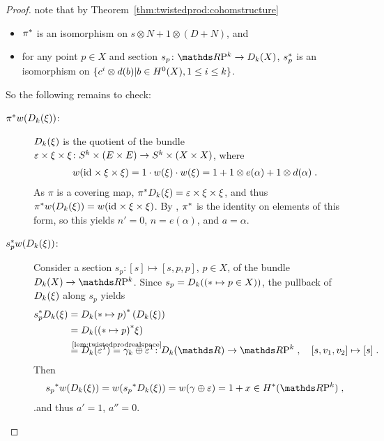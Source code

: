 \begin{Cor}
\begin{proof}
    note that by Theorem~\ref{thm:twistedprod:cohomstructure}
    \begin{itemize}
    \item ${\pi}^*$ is an isomorphism on $s\otimes N+1\otimes(D+N)$, and
    \item for any point $p\in X$ and section $s_p\colon\RP
      k\to\Twistedprod{k}{X}$, ${s}^*_p$ is an isomorphism on
      $\{c^i\otimes d(b)|b\in H^0(X), 1\leq i\leq k\}$.
    \end{itemize}
    So the following remains to check:
    \begin{description}
    \item[${\pi}^*{w}(D_{k}({\xi}))$:]
      $D_{k}({\xi})$ is the quotient of the bundle
      $\varepsilon\times\xi\times\xi\colon
      S^{k}\times(E\times E)\to S^{k}\times(X\times X)$, where
      \begin{gather*}
        {w}(\mathrm{id}_{}\times\xi\times\xi)
        = 1\cdot {w}(\xi)\cdot{w}(\xi)
        = 1 + 1\otimes e(\alpha) + 1\otimes d(\alpha)
        \;.
      \end{gather*}
      As $\pi$ is a covering map,
      ${\pi}^*D_{k}({\xi})=\varepsilon\times\xi\times\xi$,
      and thus
      ${\pi}^*{w}(D_{k}({\xi}))={w}(\mathrm{id}_{}\times\xi\times\xi)$.
      By
      ,
      ${\pi}^*$ is the identity on
      elements of this form, so this yields
      $n'=0$, $n=e(\alpha)$, and $a=\alpha$.
    \item[${s}^*_p {w}(D_{k}({\xi}))$:]
      Consider a section $s_p\colon [s]\mapsto [s,p,p]$, $p\in X$, of
      the bundle $\Twistedprod k X\to\RP k$. Since
      $s_p=D_{k}({(\ast\mapsto p\in X)})$,
      the pullback of $D_{k}({\xi})$ along $s_p$ yields
      \begin{align*}
        \pb s_p\Twistedprod{k}{\xi}
        &= \pb{\Twistedprod{k}{\ast\mapsto p}}
          \left(\Twistedprod{k}{\xi}\right) \\
        &= \Twistedprod{k}{\pb{(\ast\mapsto p)}\xi} \\
        &= \Twistedprod{k}{\trivbdl^1}
          \cequalsby{\ref{lem:twistedprodrealspace}}
          \gamma_k\oplus\trivbdl^1
          \colon
          \Twistedprod{k}{\R} \to \RP k\;,\quad
          [s, v_1,v_2] \mapsto [s]
          \;.
      \end{align*}
      Then
      \begin{gather*}
        \pb{s_p}\W{\Twistedprod{k}{\xi}}
        = \W{\pb{s_p}\Twistedprod{k}{\xi}}
        = \W{\gamma\oplus\trivbdl}
        = 1+x\in\H^*(\RP k)
        \;,
      \end{gather*}
      .and thus $a'=1$, $a''=0$.
      \qedhere
    \end{description}
  \end{proof}
\end{Cor}


